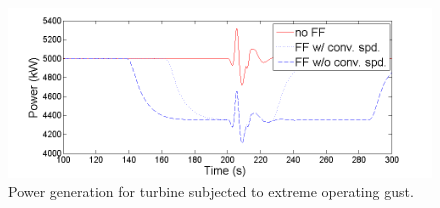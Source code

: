 \begin{figure}[htbp]
	\centering
		\includegraphics[trim = {1cm 0 2cm 0}, clip, width = \linewidth]{Figures/ch4Figures/fig4-26.png}
		
	\caption{Power generation for turbine subjected to extreme operating gust.}
	\label{fig4-26}
\end{figure}


